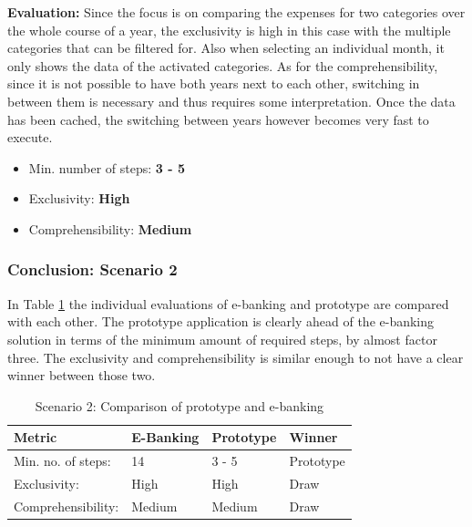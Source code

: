 \textbf{Evaluation:} Since the focus is on comparing the expenses for two categories over the whole course of a year, the exclusivity is high in this case with the multiple categories that can be filtered for. Also when selecting an individual month, it only shows the data of the activated categories. As for the comprehensibility, since it is not possible to have both years next to each other, switching in between them is necessary and thus requires some interpretation. Once the data has been cached, the switching between years however becomes very fast to execute.
\begin{itemize}[noitemsep,nolistsep]
	\item Min. number of steps: \textbf{3 - 5}
	\item Exclusivity: \textbf{High}
	\item Comprehensibility: \textbf{Medium}
\end{itemize}



\subsubsection{Conclusion: Scenario 2}

In Table \ref{tbl:scenariotwocomparison} the individual evaluations of e-banking and prototype are compared with each other. The prototype application is clearly ahead of the e-banking solution in terms of the minimum amount of required steps, by almost factor three. The exclusivity and comprehensibility is similar enough to not have a clear winner between those two.
\begin{table}[h]
	\begin{center}
		\begin{tabular}{ | p{3.2cm} | p{3.8cm} | p{3.5cm} | p{2.5cm} | }
			\hline
			\textbf{Metric} & \textbf{E-Banking} & \textbf{Prototype} & \textbf{Winner} \\
			\hline
			Min. no. of steps: & 14 & 3 - 5 & Prototype \\
			\hline
			Exclusivity: & High & High & Draw \\
			\hline
			Comprehensibility: & Medium & Medium & Draw \\
			\hline
		\end{tabular}
		\caption{Scenario 2: Comparison of prototype and e-banking}
		\label{tbl:scenariotwocomparison}
	\end{center}
\end{table}


